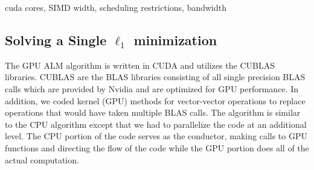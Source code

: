 \documentclass[10pt,twocolumn,letterpaper]{article}
\begin{document}




cuda cores, SIMD width, scheduling restrictions, bandwidth
\subsection{Solving a Single $\ell_1$ minimization}

The GPU ALM algorithm is written in CUDA and utilizes the CUBLAS libraries.
CUBLAS are the BLAS libraries consisting of all single precision BLAS calls
which are provided by Nvidia and are optimized for GPU performance. In
addition, we coded kernel (GPU) methods for vector-vector operations to replace
operations that would have taken multiple BLAS calls. The algorithm is similar
to the CPU algorithm except that we had to parallelize the code at an
additional level. The CPU portion of the code serves as the conductor, making
calls to GPU functions and directing the flow of the code while the GPU portion
does all of the actual computation.
\end{document}
